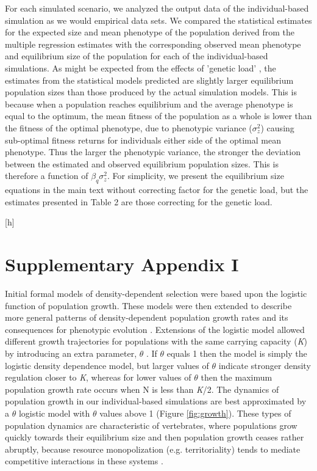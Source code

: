 \documentclass{article}
\begin{document}
 For each simulated scenario, we analyzed the output data of the individual-based simulation as we would empirical data sets. We compared the statistical estimates for the expected size and mean phenotype of the population derived from the multiple regression estimates with the corresponding observed mean phenotype and equilibrium size of the population for each of the individual-based simulations. As might be expected from the effects of 'genetic load' \citep{Lande1996}, the estimates from the statistical models predicted are slightly larger equilibrium population sizes than those produced by the actual simulation models. This is because when a population reaches equilibrium and the average phenotype is equal to the optimum, the mean fitness of the population as a whole is lower than the fitness of the optimal phenotype, due to phenotypic variance ($\sigma^2_z$) causing sub-optimal fitness returns for individuals either side of the optimal mean phenotype. Thus the larger the phenotypic variance, the stronger the deviation between the estimated and observed equilibrium population sizes. This is therefore a function of $\beta_q \sigma^2_z$. For simplicity, we present the equilibrium size equations in the main text without correcting factor for the genetic load, but the estimates presented in Table 2 are those correcting for the genetic load.  

 \label{Table 2} [h]


\section{Supplementary Appendix I}
 Initial formal models of density-dependent selection \citep{Anderson1971, Charlesworth1971} were based upon the logistic function of population growth. These models were then extended to describe more general patterns of density-dependent population growth rates \citep{Gilpin1973a} and its consequences for phenotypic evolution \citep{Gilpin1976}. Extensions of the logistic model allowed different growth trajectories for populations with the same carrying capacity (\textit{K}) by introducing an extra parameter, $\theta$ \citep{Lande2003}. If $\theta$ equals 1 then the model is simply the logistic density dependence model, but larger values of $\theta$ indicate stronger density regulation closer to \textit{K}, whereas for lower values of $\theta$ then the maximum population growth rate occurs when N is less than \textit{K}/2. The dynamics of population growth in our individual-based simulations are best approximated by a $\theta$ logistic model with $\theta$ values above 1 (Figure \ref{fig:growth}). These types of population dynamics are characteristic of vertebrates, where populations grow quickly towards their equilibrium size and then population growth ceases rather abruptly, because resource monopolization (e.g. territoriality) tends to mediate competitive interactions in these systems \citep{Gilpin1973a}. 
 
\end{document}
